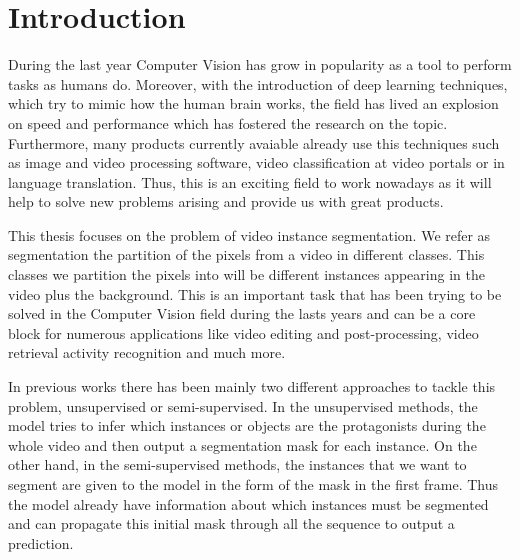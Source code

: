 
%


\chapter{Introduction}
\label{cha:introduction}

During the last year Computer Vision has grow in popularity as a tool to perform tasks as humans do.
Moreover, with the introduction of deep learning techniques, which try to mimic how the human brain works, the field has lived an explosion on speed and performance which has fostered the research on the topic.
Furthermore, many products currently avaiable already use this techniques such as image and video processing software, video classification at video portals or in language translation.
Thus, this is an exciting field to work nowadays as it will help to solve new problems arising and provide us with great products.


This thesis focuses on the problem of video instance segmentation.
We refer as segmentation the partition of the pixels from a video in different classes.
This classes we partition the pixels into will be different instances appearing in the video plus the background.
This is an important task that has been trying to be solved in the Computer Vision field during the lasts years and can be a core block for numerous applications like video editing and post-processing, video retrieval activity recognition and much more.

In previous works there has been mainly two different approaches to tackle this problem, unsupervised or semi-supervised.
In the unsupervised methods, the model tries to infer which instances or objects are the protagonists during the whole video and then output a segmentation mask for each instance.
On the other hand, in the semi-supervised methods, the instances that we want to segment are given to the model in the form of the mask in the first frame.
Thus the model already have information about which instances must be segmented and can propagate this initial mask through all the sequence to output a prediction.


